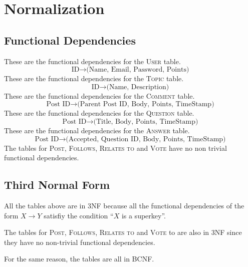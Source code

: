 \section{Normalization}
\subsection{Functional Dependencies}
These are the functional dependencies for the \textsc{User} table.
\[\text{ID} \to \text{(Name, Email, Password, Points)}\]
These are the functional dependencies for the \textsc{Topic} table.
\[\text{ID} \to \text{(Name, Description)}\]
These are the functional dependencies for the \textsc{Comment} table.
\[\text{Post ID} \to \text{(Parent Post ID, Body, Points, TimeStamp)}\]
These are the functional dependencies for the \textsc{Question} table.
\[\text{Post ID} \to \text{(Title, Body, Points, TimeStamp)}\]
These are the functional dependencies for the \textsc{Answer} table.
\[\text{Post ID} \to \text{(Accepted, Question ID, Body, Points, TimeStamp)}\]
The tables for \textsc{Post}, \textsc{Follows}, \textsc{Relates to} and \textsc{Vote} have no non trivial functional dependencies.


\subsection{Third Normal Form}
All the tables above are in 3NF because all the functional dependencies of the form \(X \to Y\) satisfiy the condition ``\(X\) is a superkey''.

The tables for \textsc{Post}, \textsc{Follows}, \textsc{Relates to} and \textsc{Vote} to are also in 3NF since they have no non-trivial functional dependencies.

For the same reason, the tables are all in BCNF.